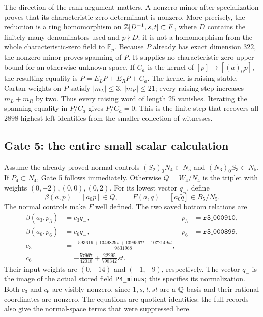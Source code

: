 The direction of the rank argument matters.  A nonzero minor after
specialization proves that its characteristic-zero determinant is
nonzero.  More precisely, the reduction is a ring homomorphism on
$\mathbb Z[D^{-1},s,t]\subset F$, where $D$ contains the finitely many
denominators used and $p\nmid D$; it is not a homomorphism from the
whole characteristic-zero field to $\mathbb F_p$.  Because $P$
already has exact dimension $322$, the nonzero minor proves
spanning of $P$.  It supplies no characteristic-zero upper bound
for an otherwise unknown space.  If $C_a$ is the kernel of
$[p]\mapsto[(a)_0p]$, the resulting equality is
$P=E_LP+E_RP+C_a$.  The kernel is raising-stable.  Cartan weights
on $P$ satisfy $|m_L|\leq3$, $|m_R|\leq21$; every raising step
increases $m_L+m_R$ by two.  Thus every raising word of length
$25$ vanishes.  Iterating the spanning equality in $P/C_a$ gives
$P/C_a=0$.  This is the finite step that recovers all $2898$
highest-left identities from the smaller collection of witnesses.

\subsection{Gate 5: the entire small scalar calculation}

Assume the already proved normal controls
$(S_2)_0N_4\subset N_5$ and $(N_3)_0S_3\subset N_5$.
If $P_4\subset N_4$, Gate 5 follows immediately.  Otherwise
$Q=W_4/N_4$ is the triplet with weights $(0,-2),(0,0),(0,2)$.
For its lowest vector $q_-$, define
\[
 \beta(a,p)=[a_0p]\in Q,\qquad
 F(a,q)=[a_0\widetilde q]\in B_5/N_5.
\]
The normal controls make $F$ well defined.  The two saved bottom
relations are
\begin{align*}
 \beta(a_3,p_3)&=c_3q_-,& p_3&=\texttt{r3\_000910},\\
 \beta(a_6,p_6)&=c_6q_-,& p_6&=\texttt{r3\_000899},\\
 c_3&=\frac{-593619+1349829s+1399567t-1072149st}{9831968},\\
 c_6&=-\frac{57967}{42018}+\frac{22295}{798342}st.
\end{align*}
Their input weights are $(0,-14)$ and $(-1,-9)$, respectively.
The vector $q_-$ is the image of the actual stored field
\texttt{P4\_minus}; this specifies its normalization.  Both
$c_3$ and $c_6$ are visibly nonzero, since $1,s,t,st$ are a
$\mathbb Q$-basis and their rational coordinates are nonzero.
The equations are quotient identities: the full records also
give the normal-space terms that were suppressed here.

